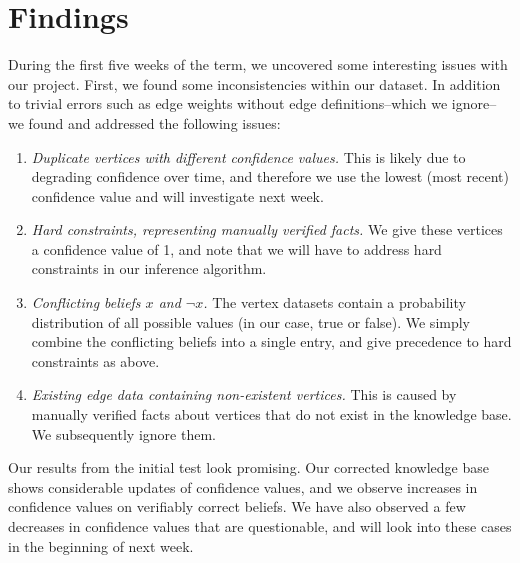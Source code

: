 \section{Findings}
During the first five weeks of the term, we uncovered some interesting issues with our project.
First, we found some inconsistencies within our dataset.
In addition to trivial errors such as edge weights without edge definitions--which we ignore--
we found and addressed the following issues:
\begin{enumerate}
\item \emph{Duplicate vertices with different confidence values.} This is likely due to degrading confidence over time,
and therefore we use the lowest (most recent) confidence value and will investigate next week.
\item \emph{Hard constraints, representing manually verified facts.} We give these vertices a confidence value of 1,
and note that we will have to address hard constraints in our inference algorithm.
\item \emph{Conflicting beliefs $x$ and $\neg x$.} The vertex datasets contain a probability distribution of all possible values
(in our case, true or false).  We simply combine the conflicting beliefs into a single entry, and give precedence
to hard constraints as above.
\item \emph{Existing edge data containing non-existent vertices.} This is caused by manually verified facts about
vertices that do not exist in the knowledge base. We subsequently ignore them.
\end{enumerate}

Our results from the initial test look promising.
Our corrected knowledge base shows considerable updates of confidence values,
and we observe increases in confidence values on verifiably correct beliefs.
We have also observed a few decreases in confidence values that are questionable,
and will look into these cases in the beginning of next week.

